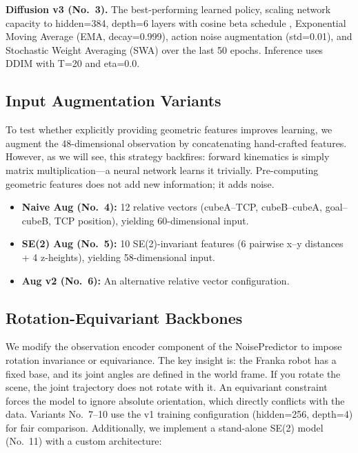 \documentclass[twocolumn]{article}
\begin{document}
\noindent\textbf{Diffusion v3 (No.~3).} The best-performing learned policy, scaling network capacity to hidden=384, depth=6 layers with cosine beta schedule \cite{nichol2021improved}, Exponential Moving Average (EMA, decay=0.999), action noise augmentation (std=0.01), and Stochastic Weight Averaging (SWA) over the last 50 epochs. Inference uses DDIM with T=20 and eta=0.0.

\subsection{Input Augmentation Variants}
\label{sec:aug}

To test whether explicitly providing geometric features improves learning, we augment the 48-dimensional observation by concatenating hand-crafted features. However, as we will see, this strategy backfires: forward kinematics is simply matrix multiplication---a neural network learns it trivially. Pre-computing geometric features does not add new information; it adds noise.

\begin{itemize}
    \item \textbf{Naive Aug (No.~4):} 12 relative vectors (cubeA--TCP, cubeB--cubeA, goal--cubeB, TCP position), yielding 60-dimensional input.
    \item \textbf{SE(2) Aug (No.~5):} 10 SE(2)-invariant features (6 pairwise x--y distances + 4 z-heights), yielding 58-dimensional input.
    \item \textbf{Aug v2 (No.~6):} An alternative relative vector configuration.
\end{itemize}

\subsection{Rotation-Equivariant Backbones}
\label{sec:equiv}

We modify the observation encoder component of the NoisePredictor to impose rotation invariance or equivariance. The key insight is: the Franka robot has a fixed base, and its joint angles are defined in the world frame. If you rotate the scene, the joint trajectory does not rotate with it. An equivariant constraint forces the model to ignore absolute orientation, which directly conflicts with the data. Variants No.~7--10 use the v1 training configuration (hidden=256, depth=4) for fair comparison. Additionally, we implement a stand-alone SE(2) model (No.~11) with a custom architecture:
\end{document}
